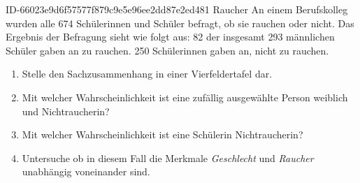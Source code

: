 \begin{exercise}
      {ID-66023e9d6f57577f879c9e5e96ee2dd87e2ed481}
      {Raucher}
  \ifproblem\problem
    An einem Berufskolleg wurden alle 674 Schülerinnen und Schüler befragt,
    ob sie rauchen oder nicht. Das Ergebnis der Befragung sieht wie folgt aus:
    82 der insgesamt 293 männlichen Schüler gaben an zu rauchen.
    250 Schülerinnen gaben an, nicht zu rauchen.
    \begin{enumerate}
      \item Stelle den Sachzusammenhang in einer Vierfeldertafel dar.
      \item Mit welcher Wahrscheinlichkeit ist eine zufällig ausgewählte
            Person weiblich und Nichtraucherin?
      \item Mit welcher Wahrscheinlichkeit ist eine Schülerin Nichtraucherin?
      \item Untersuche ob in diesem Fall die Merkmale \textit{Geschlecht}
            und \textit{Raucher} unabhängig voneinander sind.
    \end{enumerate}
  \fi
\end{exercise}
